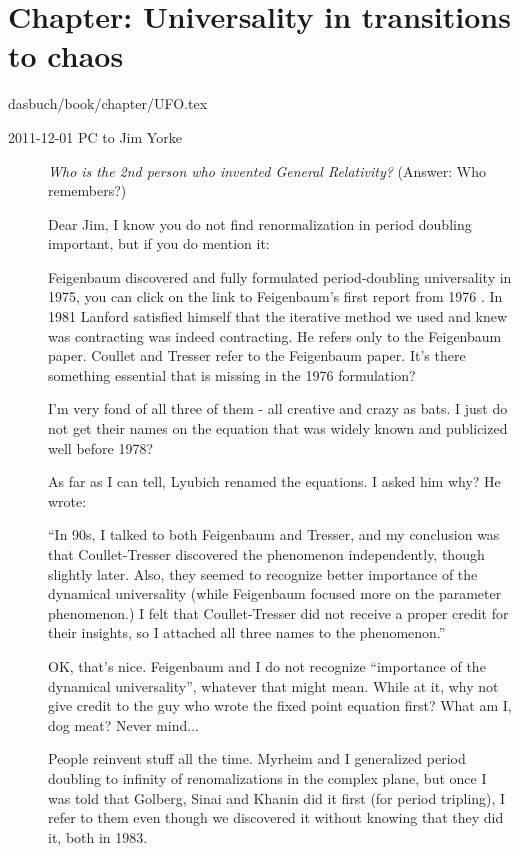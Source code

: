\section{Chapter: Universality in transitions to chaos}
\label{c-UFO}\noindent dasbuch/book/chapter/UFO.tex
\begin{description}
\item[2011-12-01 PC to Jim Yorke]
\emph{Who is the 2nd person who invented General Relativity?}
(Answer: Who remembers?)

Dear Jim, I know you do not find renormalization in period doubling
important, but if you do mention it:


Feigenbaum discovered and fully formulated period-doubling universality
in 1975, you can click on the link to Feigenbaum's first report from 1976
.
In 1981 Lanford satisfied himself that the iterative method we used and
knew was contracting was indeed contracting. He refers only to the
Feigenbaum paper.
{Coullet and Tresser} refer to the Feigenbaum paper. It's there something
essential that is missing in the 1976 formulation?

I'm very fond of all three of them - all creative and crazy as bats. I
just do not get their names on the equation that was widely known and
publicized well before 1978?

As far as I can tell, Lyubich renamed the equations. I asked him why? He
wrote:

``In 90s, I talked to both Feigenbaum and Tresser, and my conclusion was
that Coullet-Tresser discovered the phenomenon independently, though
slightly later. Also, they seemed to recognize better importance of the
dynamical universality (while Feigenbaum focused more on  the parameter
phenomenon.) I felt that Coullet-Tresser did  not receive a proper credit
for their insights, so I attached all three names to the phenomenon.''

OK, that's nice. Feigenbaum and I do not recognize ``importance of the
dynamical universality'', whatever that might mean. While at it, why not
give credit to the guy who wrote the fixed point equation first? What am
I, dog meat? Never mind...

People reinvent stuff all the time. Myrheim and I generalized period
doubling to
{infinity of renomalizations} in the complex plane, but once I was told
that Golberg, Sinai and Khanin did it first (for period tripling), I
refer to them even though we discovered it without knowing that they did
it, both in 1983.


\end{description}
